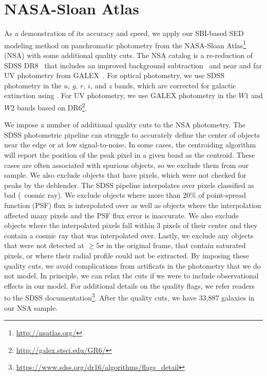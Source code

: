 \section{NASA-Sloan Atlas} \label{sec:obs}
As a demonstration of its accuracy and speed, we apply our SBI-based SED
modeling method on panchromatic photometry from the NASA-Sloan
Atlas\footnote{\url{http://nsatlas.org/}} (NSA) with some additional quality
cuts.
The NSA catalog is a re-reduction of SDSS DR8~\citep{aihara2011} that includes
an improved background subtraction~\citep{blanton2011} and near and far UV
photometry from GALEX~\citep{}.
For optical photometry, we use SDSS photometry in the $u$, $g$, $r$, $i$, and
$z$ bands, which are corrected for galactic extinction using \cite{schlegel1997}.
For UV photometry, we use GALEX photometry in the $W1$ and $W2$ bands
based on DR6\footnote{\url{http://galex.stsci.edu/GR6/}}.

We impose a number of additional quality cuts to the NSA photometry.
The SDSS photometric pipeline can struggle to accurately define the center
of objects near the edge or at low signal-to-noise. 
In some cases, the centroiding algorithm will report the position of the peak
pixel in a given band as the centroid. 
These cases are often associated with spurious objects, so we exclude them
from our sample. 
We also exclude objects that have pixels, which were not checked for peaks
by the deblender. %
The SDSS pipeline interpolates over pixels classified as bad (\eg~cosmic ray).
We exclude objects where more than 20\% of point-spread function (PSF) flux is
interpolated over as well as objects where the interpolation affected many
pixels and the PSF flux error is inaccurate. 
We also exclude objects where the interpolated pixels fall within 3 pixels of
their center and they contain a cosmic ray that was interpolated over.
Lastly, we exclude any objects that were not detected at $\ge5\sigma$ in the
original frame, that contain saturated pixels, or where their radial profile 
could not be extracted.
By imposing these quality cuts, we avoid complications from artificats in the
photometry that we do not model. 
In principle, we can relax the cuts if we were to include observational effects
in our model.
For additional details on the quality flags, we refer readers to the SDSS
documentation\footnote{\url{https://www.sdss.org/dr16/algorithms/flags_detail}}.
After the quality cuts, we have 33,887 galaxies in our NSA sample.


